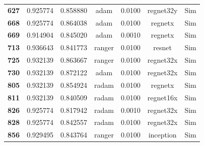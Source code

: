 \begin{table}
\begin{tabular}{c|c|c|c|c|c|}
\textbf{627} &      0.925774 &     0.858880 &    adam &  0.0100 &  regnet32y &        Sim \\
\textbf{668} &      0.925774 &     0.864038 &    adam &  0.0100 &    regnetx &        Sim \\
\textbf{669} &      0.914904 &     0.845020 &    adam &  0.0010 &    regnetx &        Sim \\
\textbf{713} &      0.936643 &     0.841773 &  ranger &  0.0100 &     resnet &        Sim \\
\textbf{725} &      0.932139 &     0.863667 &  ranger &  0.0100 &  regnet32x &        Sim \\
\textbf{730} &      0.932139 &     0.872122 &    adam &  0.0100 &  regnet32x &        Sim \\
\textbf{805} &      0.932139 &     0.854924 &   radam &  0.0100 &    regnetx &        Sim \\
\textbf{811} &      0.932139 &     0.840509 &   radam &  0.0100 &  regnet16x &        Sim \\
\textbf{826} &      0.925774 &     0.817942 &   radam &  0.0010 &  regnet32x &        Sim \\
\textbf{828} &      0.925774 &     0.842557 &   radam &  0.0100 &  regnet32x &        Sim \\
\textbf{856} &      0.929495 &     0.843764 &  ranger &  0.0100 &  inception &        Sim \\
\bottomrule
\end{tabular}
\end{table}
